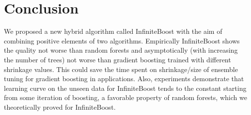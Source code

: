 \section{Conclusion}

We proposed a new hybrid algorithm called InfiniteBoost with the aim of combining positive elements of two algorithms. 
Empirically InfiniteBoost shows the quality not worse than random forests and asymptotically (with increasing the number of trees) not worse than gradient boosting trained with different shrinkage values.
This could save the time spent on shrinkage/size of ensemble tuning for gradient boosting in applications.
Also, experiments demonstrate that learning curve on the unseen data for InfiniteBoost tends to the constant starting from some iteration of boosting, a favorable property of random forests, which we theoretically proved for InfiniteBoost.

